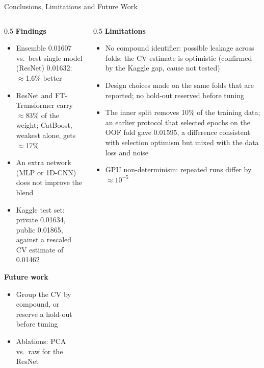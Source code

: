 \documentclass[9pt,aspectratio=169]{beamer}
\begin{document}
\begin{frame}{Conclusions, Limitations and Future Work}
  \small
  \begin{columns}[T]
    \begin{column}{0.5\textwidth}
      \textbf{Findings}
      \begin{itemize}
        \item Ensemble 0.01607 vs.\ best single model (ResNet) 0.01632: $\approx$1.6\% better
        \item ResNet and FT-Transformer carry $\approx$83\% of the weight; CatBoost, weakest alone, gets $\approx$17\%
        \item An extra network (MLP or 1D-CNN) does not improve the blend
        \item Kaggle test set: private 0.01634, public 0.01865, against a rescaled CV estimate of 0.01462
      \end{itemize}
      \textbf{Future work}
      \begin{itemize}
        \item Group the CV by compound, or reserve a hold-out before tuning
        \item Ablations: PCA vs.\ raw for the ResNet
      \end{itemize}
    \end{column}
    \begin{column}{0.5\textwidth}
      \textbf{Limitations}
      \begin{itemize}
        \item No compound identifier: possible leakage across folds; the CV estimate is optimistic (confirmed by the Kaggle gap, cause not tested)
        \item Design choices made on the same folds that are reported; no hold-out reserved before tuning
        \item The inner split removes 10\% of the training data; an earlier protocol that selected epochs on the OOF fold gave 0.01595, a difference consistent with selection optimism but mixed with the data loss and noise
        \item GPU non-determinism: repeated runs differ by $\approx 10^{-5}$
      \end{itemize}
    \end{column}
  \end{columns}
\end{frame}
\end{document}
